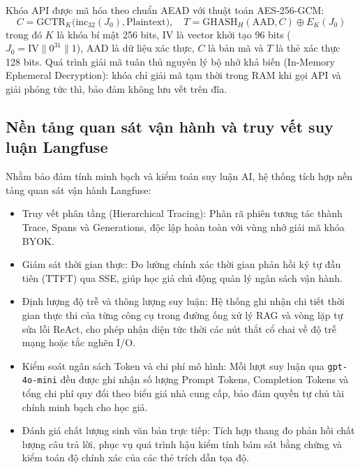 Khóa API được mã hóa theo chuẩn AEAD với thuật toán AES-256-GCM:
\vspace{-12pt}
\begin{equation}
\label{eq:aes_gcm}
C = \text{GCTR}_K\bigl(\text{inc}_{32}(J_0), \text{Plaintext}\bigr), \quad T = \text{GHASH}_H(\text{AAD}, C) \oplus E_K(J_0)
\end{equation}
\vspace{-12pt}
trong đó $K$ là khóa bí mật 256 bits, $\text{IV}$ là vector khởi tạo 96 bits ($J_0 = \text{IV} \parallel 0^{31} \parallel 1$), $\text{AAD}$ là dữ liệu xác thực, $C$ là bản mã và $T$ là thẻ xác thực 128 bits. Quá trình giải mã tuân thủ nguyên lý bộ nhớ khả biến (In-Memory Ephemeral Decryption): khóa chỉ giải mã tạm thời trong RAM khi gọi API và giải phóng tức thì, bảo đảm không lưu vết trên đĩa.

\enlargethispage{\baselineskip}
\subsection{Nền tảng quan sát vận hành và truy vết suy luận Langfuse}
\label{subsec:langfuse_tracing}
Nhằm bảo đảm tính minh bạch và kiểm toán suy luận AI, hệ thống tích hợp nền tảng quan sát vận hành Langfuse:
\begin{itemize}
    \item Truy vết phân tầng (Hierarchical Tracing): Phân rã phiên tương tác thành Trace, Spans và Generations, độc lập hoàn toàn với vùng nhớ giải mã khóa BYOK.
    \item Giám sát thời gian thực: Đo lường chính xác thời gian phản hồi ký tự đầu tiên (TTFT) qua SSE, giúp học giả chủ động quản lý ngân sách vận hành.
    \item Định lượng độ trễ và thông lượng suy luận: Hệ thống ghi nhận chi tiết thời gian thực thi của từng công cụ trong đường ống xử lý RAG và vòng lặp tự sửa lỗi ReAct, cho phép nhận diện tức thời các nút thắt cổ chai về độ trễ mạng hoặc tắc nghẽn I/O.
    \item Kiểm soát ngân sách Token và chi phí mô hình: Mỗi lượt suy luận qua \texttt{gpt-4o-mini} đều được ghi nhận số lượng Prompt Tokens, Completion Tokens và tổng chi phí quy đổi theo biểu giá nhà cung cấp, bảo đảm quyền tự chủ tài chính minh bạch cho học giả.
    \item Đánh giá chất lượng sinh văn bản trực tiếp: Tích hợp thang đo phản hồi chất lượng câu trả lời, phục vụ quá trình hậu kiểm tính bám sát bằng chứng và kiểm toán độ chính xác của các thẻ trích dẫn tọa độ.
\end{itemize}
